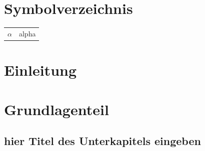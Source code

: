\documentclass[a4paper,12pt,parskip,bibtotoc,liststotoc]{article}
\newcommand{\url}{\;}   %
\begin{document}
\section*{Symbolverzeichnis}
\begin{table}[h!]
    \vspace*{-3mm}
    \hspace*{2mm}
  \renewcommand{\arraystretch}{1,5}
    \begin{tabular}{ll}  %
     $\alpha$	& alpha\\     %
	\end{tabular}
\end{table}

\newpage

%
%
\section{Einleitung}

%
%
\section{Grundlagenteil}


\subsection{hier Titel des Unterkapitels eingeben}
%
\end{document}
